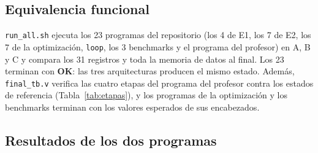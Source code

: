 \documentclass[12pt,a4paper]{article}
\begin{document}
\subsection{Equivalencia funcional}

\texttt{run\_all.sh} ejecuta los 23 programas del repositorio (los 4 de E1, los 7 de E2, los 7 de la optimización, \texttt{loop}, los 3 benchmarks y el programa del profesor) en A, B y C y compara los 31 registros y toda la memoria de datos al final. Los 23 terminan con \textbf{OK}: las tres arquitecturas producen el mismo estado. Además, \texttt{final\_tb.v} verifica las cuatro etapas del programa del profesor contra los estados de referencia (Tabla~\ref{tab:etapas}), y los programas de la optimización y los benchmarks terminan con los valores esperados de sus encabezados.

\subsection{Resultados de los dos programas}
\end{document}
